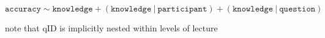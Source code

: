 \documentclass[10pt]{article}
\begin{document}






$$
    \mathtt{accuracy \sim knowledge + (knowledge\ \vert\ participant) + (knowledge\ \vert\ question)}
$$

note that qID is implicitly nested within levels of lecture
\end{document}
